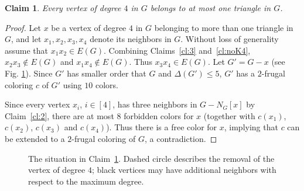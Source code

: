 \documentclass[11pt]{article}
\newtheorem{claim}{Claim}
\begin{document}
\begin{claim} Every vertex of degree $4$ in $G$ belongs to at most one triangle in $G$.
\label{cl:4}
\end{claim} 
\begin{proof}
Let $x$ be a vertex of degree $4$ in $G$ belonging to more than one triangle in $G$, and let $x_1,x_2,x_3,x_4$ denote its neighbors in $G$. Without loss of generality assume that $x_1x_2\in E(G)$. Combining Claims~\ref{cl:3} and~\ref{cl:noK4}, $x_2x_3\not\in E(G)$ and $x_1x_4\not\in E(G)$. Thus $x_3x_4\in E(G)$. Let $G'=G-x$ (see Fig. \ref{fig:cl:4}). Since $G'$ has smaller order that $G$ and $\Delta(G')\le 5$, $G'$ has a $2$-frugal coloring $c$ of $G'$ using $10$ colors.

Since every vertex $x_i$, $i\in[4]$, has three neighbors in $G-N_G[x]$ by Claim~\ref{cl:2}, there are at most $8$ forbidden colors for $x$ (together with $c(x_1)$, $c(x_2)$, $c(x_3)$ and $c(x_4)$). Thus there is a free color for $x$, implying that $c$ can be extended to a $2$-frugal coloring of $G$, a contradiction.
\end{proof}


\begin{figure}[ht!]
\begin{center}

\caption{The situation in Claim~\ref{cl:4}. Dashed circle describes the removal of the vertex of degree $4$; black vertices may have additional neighbors with respect to the maximum degree. }\label{fig:cl:4}
\end{center}
\end{figure}
\end{document}
